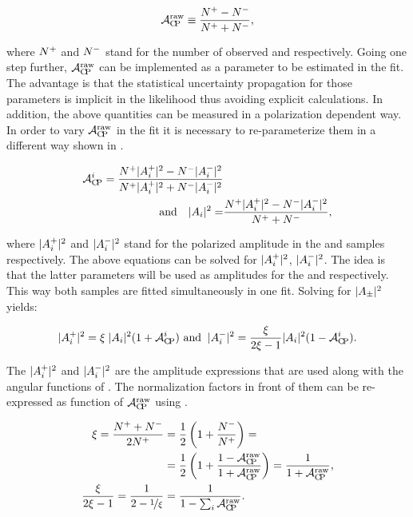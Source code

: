 \begin{equation}
\mathcal{A}_{\rm C\!P}^{\text{raw}} \equiv \frac{{N^+} - {N^-}}{{N^+} + {N^-}},
\label{acp_mes}
\end{equation}

\noindent where ${N^+}$ and ${N^-}$ stand for the number of observed \BsbarJpsiKst and \BsJpsiKst respectively.
Going one step further, $\mathcal{A}_{\rm C\!P}^{\text{raw}}$ can be implemented as a parameter to be estimated in the fit. The advantage
is that the statistical uncertainty propagation for those parameters is implicit in the likelihood thus avoiding
explicit calculations. In addition, the above quantities can be measured in a polarization dependent way. In order
to vary $\mathcal{A}_{\rm C\!P}^{\text{raw}}$ in the fit it is necessary to re-parameterize them in a different way shown in .

\begin{align}
  \label{acp_param}
\mathcal{A}_{\rm C\!P}^{i} = \frac{{N^+}|{A}_{i}^+|^2 - {N^-}|{A}_{i}^-|^2}{{N^+}|{A}_{i}^+|^2 + {N^-}|{A}_{i}^-|^2 } & \\
\text{and} \quad |{A}_{i}|^2 = &\frac{ {N^+} |{A}_{i}^+|^2 - {N^-}|{A}_{i}^-|^2}{{N^+} + {N^-}},
\end{align}


\noindent where $|{A}_{i}^+|^2$ and $|{A}_{i}^-|^2$ stand for the polarized amplitude in the \BsbarJpsiKst
and \BsJpsiKst samples respectively. The above equations can be solved for $|{A}_{i}^+|^2$, $|{A}_{i}^-|^2$. The idea
is that the latter parameters will be used as amplitudes for the \BsbarJpsiKst and \BsJpsiKst \pdfs respectively.
This way both samples are fitted simultaneously in one fit. Solving  for $|{A}_{\pm}|^2$ yields:

\begin{equation}
|{A}_{i}^+|^2 = \xi \; |{A}_{i}|^2 (1+\mathcal{A}_{\rm C\!P}^{i}) \,\, \text{and}\;\; |{A}_{i}^-|^2 = \frac{\xi}{2\xi-1} |{A}_{i}|^2 (1-\mathcal{A}_{\rm C\!P}^{i}).
\label{acp_free}
\end{equation}

\noindent The $|{A}_{i}^+|^2$ and $|{A}_{i}^-|^2$ are the amplitude expressions that are used along with the angular functions of .
The normalization factors in front of them can be re-expressed as function of $\mathcal{A}_{\rm C\!P}^{\text{raw}}$ using .

\begin{align}
\xi = \frac{{N^+}+{N^-}}{2{N^+}} &= \frac{1}{2}\left( 1 + \frac{N^{-}_{}}{N^{+}_{}}\right) = \nonumber \\
                                     &= \frac{1}{2}\left( 1 + \frac{1-\mathcal{A}_{\rm C\!P}^{\text{raw}}}{1+\mathcal{A}_{\rm C\!P}^{\text{raw}}}\right) =
                                        \frac{1}{1+\mathcal{A}_{\rm C\!P}^{\text{raw}}},  \\
\frac{\xi}{2\xi-1} = \frac{1}{2-\nicefrac{1}{\xi}} &= \frac{1}{1-\sum_i\mathcal{A}_{\rm C\!P}^{\text{raw}}}.
\label{amp_norms}
\end{align}

